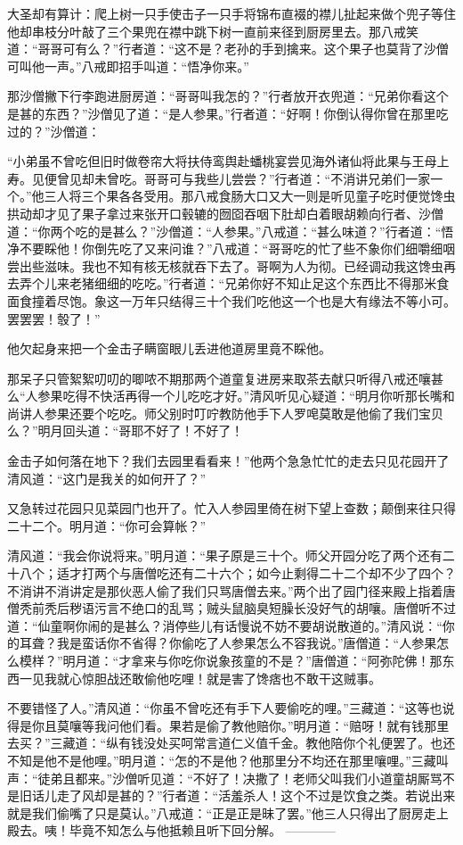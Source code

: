 \documentclass[12pt,UTF8]{ctexbook}
\begin{document}
大圣却有算计：爬上树一只手使击子一只手将锦布直裰的襟儿扯起来做个兜子等住他却串枝分叶敲了三个果兜在襟中跳下树一直前来径到厨房里去。那八戒笑道：“哥哥可有么？”行者道：“这不是？老孙的手到擒来。这个果子也莫背了沙僧可叫他一声。”八戒即招手叫道：“悟净你来。”

那沙僧撇下行李跑进厨房道：“哥哥叫我怎的？”行者放开衣兜道：“兄弟你看这个是甚的东西？”沙僧见了道：“是人参果。”行者道：“好啊！你倒认得你曾在那里吃过的？”沙僧道：

“小弟虽不曾吃但旧时做卷帘大将扶侍鸾舆赴蟠桃宴尝见海外诸仙将此果与王母上寿。见便曾见却未曾吃。哥哥可与我些儿尝尝？”行者道：“不消讲兄弟们一家一个。”他三人将三个果各各受用。那八戒食肠大口又大一则是听见童子吃时便觉馋虫拱动却才见了果子拿过来张开口毂辘的囫囵吞咽下肚却白着眼胡赖向行者、沙僧道：“你两个吃的是甚么？”沙僧道：“人参果。”八戒道：“甚么味道？”行者道：“悟净不要睬他！你倒先吃了又来问谁？”八戒道：“哥哥吃的忙了些不象你们细嚼细咽尝出些滋味。我也不知有核无核就吞下去了。哥啊为人为彻。已经调动我这馋虫再去弄个儿来老猪细细的吃吃。”行者道：“兄弟你好不知止足这个东西比不得那米食面食撞着尽饱。象这一万年只结得三十个我们吃他这一个也是大有缘法不等小可。罢罢罢！彀了！”

他欠起身来把一个金击子瞒窗眼儿丢进他道房里竟不睬他。

那呆子只管絮絮叨叨的唧哝不期那两个道童复进房来取茶去献只听得八戒还嚷甚么“人参果吃得不快活再得一个儿吃吃才好。”清风听见心疑道：“明月你听那长嘴和尚讲人参果还要个吃吃。师父别时叮咛教防他手下人罗唣莫敢是他偷了我们宝贝么？”明月回头道：“哥耶不好了！不好了！

金击子如何落在地下？我们去园里看看来！”他两个急急忙忙的走去只见花园开了清风道：“这门是我关的如何开了？”

又急转过花园只见菜园门也开了。忙入人参园里倚在树下望上查数；颠倒来往只得二十二个。明月道：“你可会算帐？”

清风道：“我会你说将来。”明月道：“果子原是三十个。师父开园分吃了两个还有二十八个；适才打两个与唐僧吃还有二十六个；如今止剩得二十二个却不少了四个？不消讲不消讲定是那伙恶人偷了我们只骂唐僧去来。”两个出了园门径来殿上指着唐僧秃前秃后秽语污言不绝口的乱骂；贼头鼠脑臭短臊长没好气的胡嚷。唐僧听不过道：“仙童啊你闹的是甚么？消停些儿有话慢说不妨不要胡说散道的。”清风说：“你的耳聋？我是蛮话你不省得？你偷吃了人参果怎么不容我说。”唐僧道：“人参果怎么模样？”明月道：“才拿来与你吃你说象孩童的不是？”唐僧道：“阿弥陀佛！那东西一见我就心惊胆战还敢偷他吃哩！就是害了馋痞也不敢干这贼事。

不要错怪了人。”清风道：“你虽不曾吃还有手下人要偷吃的哩。”三藏道：“这等也说得是你且莫嚷等我问他们看。果若是偷了教他赔你。”明月道：“赔呀！就有钱那里去买？”三藏道：“纵有钱没处买呵常言道仁义值千金。教他陪你个礼便罢了。也还不知是他不是他哩。”明月道：“怎的不是他？他那里分不均还在那里嚷哩。”三藏叫声：“徒弟且都来。”沙僧听见道：“不好了！决撒了！老师父叫我们小道童胡厮骂不是旧话儿走了风却是甚的？”行者道：“活羞杀人！这个不过是饮食之类。若说出来就是我们偷嘴了只是莫认。”八戒道：“正是正是昧了罢。”他三人只得出了厨房走上殿去。咦！毕竟不知怎么与他抵赖且听下回分解。
------------
\end{document}
